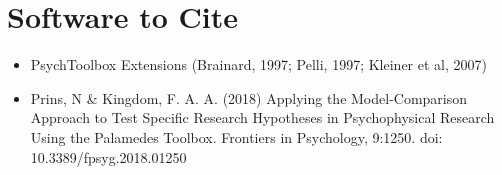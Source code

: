 \documentclass[11pt]{article} %
\begin{document}
\section{Software to Cite}
\begin{itemize}
\item PsychToolbox Extensions (Brainard, 1997; Pelli, 1997; Kleiner et al, 2007)
\item Prins, N \& Kingdom, F. A. A. (2018) Applying the Model-Comparison Approach to Test Specific Research Hypotheses in Psychophysical Research Using the Palamedes Toolbox. Frontiers in Psychology, 9:1250. doi: 10.3389/fpsyg.2018.01250
\end{itemize}
\end{document}
